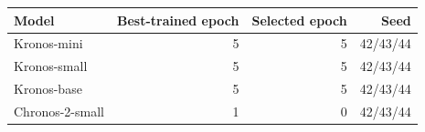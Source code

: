 \begin{tabular}{@{}lrrr@{}}
\toprule
Model & Best-trained epoch & Selected epoch & Seed \\
\midrule
Kronos-mini & 5 & 5 & 42/43/44 \\
Kronos-small & 5 & 5 & 42/43/44 \\
Kronos-base & 5 & 5 & 42/43/44 \\
Chronos-2-small & 1 & 0 & 42/43/44 \\
\bottomrule
\end{tabular}

